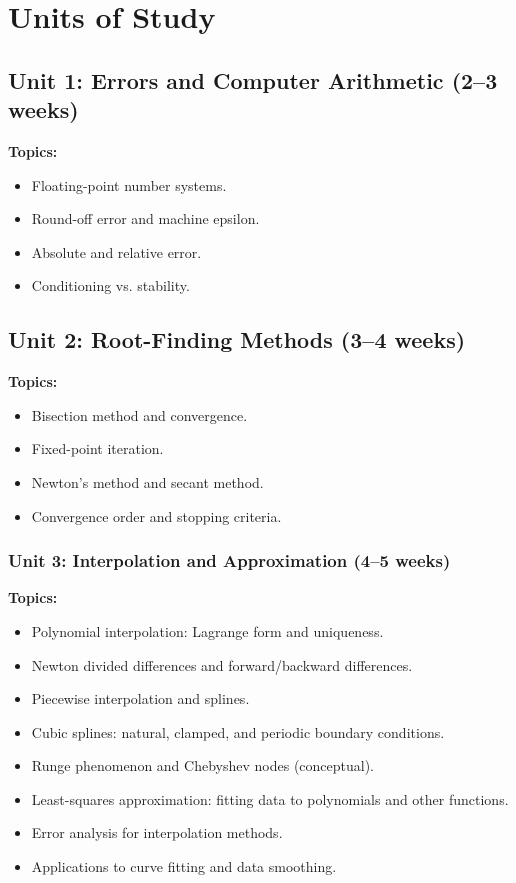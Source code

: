 \documentclass[12pt,oneside]{book}
\begin{document}
\section{Units of Study}

\subsection{Unit 1: Errors and Computer Arithmetic (2--3 weeks)}

\textbf{Topics:}
\begin{itemize}
    \item Floating-point number systems.
    \item Round-off error and machine epsilon.
    \item Absolute and relative error.
    \item Conditioning vs. stability.
\end{itemize}

\subsection{Unit 2: Root-Finding Methods (3--4 weeks)}

\textbf{Topics:}
\begin{itemize}
    \item Bisection method and convergence.
    \item Fixed-point iteration.
    \item Newton’s method and secant method.
    \item Convergence order and stopping criteria.
\end{itemize}

\subsubsection{Unit 3: Interpolation and Approximation (4–5 weeks)}

\textbf{Topics:}
\begin{itemize}
    \item Polynomial interpolation: Lagrange form and uniqueness.
    \item Newton divided differences and forward/backward differences.
    \item Piecewise interpolation and splines.
    \item Cubic splines: natural, clamped, and periodic boundary conditions.
    \item Runge phenomenon and Chebyshev nodes (conceptual).
    \item Least-squares approximation: fitting data to polynomials and other functions.
    \item Error analysis for interpolation methods.
    \item Applications to curve fitting and data smoothing.
\end{itemize}
\end{document}
